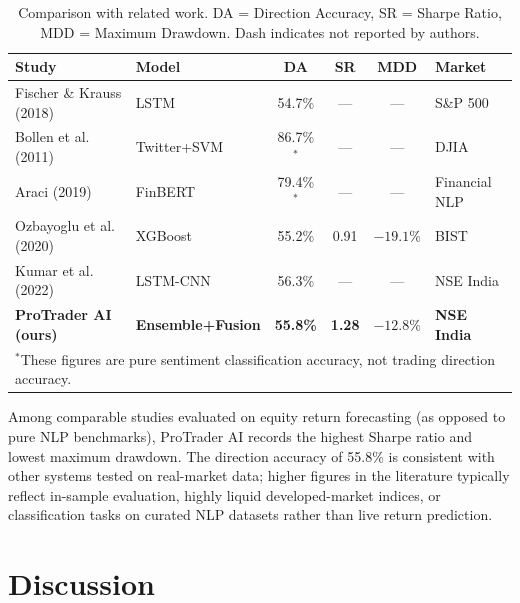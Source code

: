 \documentclass[10pt,a4paper,twoside]{article}
\begin{document}
\begin{table}[htb]
  \begin{center}
    {\caption{Comparison with related work. DA = Direction Accuracy, SR = Sharpe
    Ratio, MDD = Maximum Drawdown. Dash indicates not reported by
    authors.}\label{tab:comparison}}
    \begin{tabular}{|l|l|c|c|c|l|}
    \hline
    \textbf{Study} & \textbf{Model} & \textbf{DA} & \textbf{SR} & \textbf{MDD} & \textbf{Market} \\
    \hline
    Fischer \& Krauss (2018)~\cite{fischer2018} & LSTM & 54.7\% & --- & --- & S\&P 500 \\
    Bollen et al. (2011)~\cite{bollen2011} & Twitter+SVM & 86.7\%$^*$ & --- & --- & DJIA \\
    Araci (2019)~\cite{araci2019} & FinBERT & 79.4\%$^*$ & --- & --- & Financial NLP \\
    Ozbayoglu et al. (2020)~\cite{ozbayoglu2020} & XGBoost & 55.2\% & 0.91 & $-19.1\%$ & BIST \\
    Kumar et al. (2022)~\cite{kumar2022} & LSTM-CNN & 56.3\% & --- & --- & NSE India \\
    \textbf{ProTrader AI (ours)} & \textbf{Ensemble+Fusion} & \textbf{55.8\%} & \textbf{1.28} & \textbf{$-12.8\%$} & \textbf{NSE India} \\
    \hline
    \multicolumn{6}{l}{$^*$These figures are pure sentiment classification accuracy, not trading direction accuracy.} \\
    \hline
    \end{tabular}
  \end{center}
\end{table}

Among comparable studies evaluated on equity return forecasting (as opposed to
pure NLP benchmarks), ProTrader AI records the highest Sharpe ratio and lowest
maximum drawdown. The direction accuracy of 55.8\% is consistent with other
systems tested on real-market data; higher figures in the literature typically
reflect in-sample evaluation, highly liquid developed-market indices, or
classification tasks on curated NLP datasets rather than live return prediction.

\section{Discussion}
\end{document}

